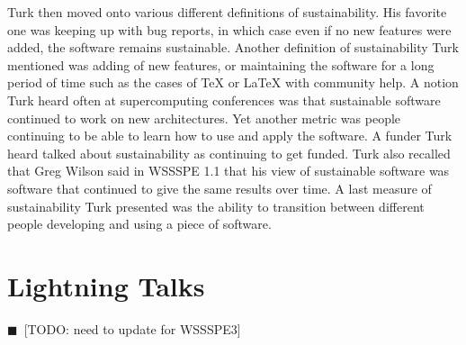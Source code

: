 \documentclass[11pt, oneside]{amsart}
\newcommand{\todo}[1]{{\color{blue}$\blacksquare$~\textsf{[TODO: #1]}}}
\newcommand{\note}[1]{ {\textcolor{blueish}    { ***Note:      #1 }}}
\begin{document}
Turk then moved onto various different definitions of sustainability. His 
favorite one was keeping up with bug reports, in which case even if no new
features were added, the software remains sustainable. Another definition of
sustainability Turk mentioned was adding of new features, or maintaining the
software for a long period of time such as the cases of TeX or LaTeX with
community help. A notion Turk heard often at supercomputing conferences was that
sustainable software continued to work on new architectures. Yet another metric
was people continuing to be able to learn how to use and apply the software.
A funder Turk heard talked about sustainability as continuing to get funded. Turk also
recalled that Greg Wilson said in WSSSPE 1.1 that his view of sustainable software
was software that continued to give the same results over time. A last measure
of sustainability Turk presented was the ability to transition between different people
developing and using a piece of software.


\section{Lightning Talks} \label{sec:lightning}
\todo{need to update for WSSSPE3}
\begin{comment}
\note{
\href{http://wssspe.researchcomputing.org.uk/wssspe3/agenda/}{Slides.}}
\end{comment}
\end{document}
